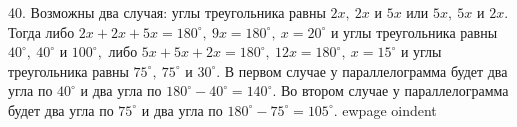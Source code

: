 40. Возможны два случая: углы треугольника равны $2x,\ 2x$ и $5x$ или $5x,\ 5x$ и $2x.$ Тогда либо $2x+2x+5x=180^\circ,\ 9x=180^\circ,\ x=20^\circ$ и углы треугольника равны $40^\circ,\ 40^\circ$  и $100^\circ,$ либо $5x+5x+2x=180^\circ,\ 12x=180^\circ,\ x=15^\circ$ и углы треугольника равны $75^\circ,\ 75^\circ$ и $30^\circ.$ В первом случае у параллелограмма будет два угла по $40^\circ$ и два угла по $180^\circ-40^\circ=140^\circ.$ Во втором случае у параллелограмма будет два угла по $75^\circ$ и два угла по $180^\circ-75^\circ=105^\circ.$
ewpage
oindent
